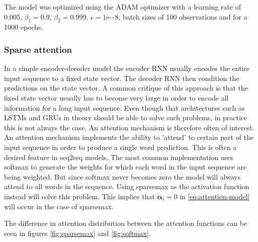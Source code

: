 The model was optimized using the ADAM optimizer with a learning rate of 0.005, $\beta_1=0.9, \, \beta_2 = 0.999, \, \epsilon = 1\mathrm{e}{-8}$, batch sizes of 100 observations and for a 1000 epochs.

\subsubsection{Sparse attention}
In a simple encoder-decoder model the encoder RNN usually encodes the entire input sequence to a fixed state vector. The decoder RNN then condition the predictions on the state vector. A common critique of this approach is that the fixed state vector usually has to become very large in order to encode all information for a long input sequence. Even though that architectures such as LSTMs and GRUs in theory should be able to solve such problems, in practice this is not always the case. An attention mechanism is therefore often of interest. An attention mechanism implements the ability to 'attend' to certain part of the input sequence in order to produce a single word prediction. This is often a desired feature in seq2seq models. The most common implementation uses softmax to generate the weights for which each word in the input sequence are being weighted. But since softmax never becomes zero the model will always attend to all words in the sequence. Using sparsemax as the activation function instead will solve this problem. This implies that $\boldsymbol\alpha_i=0$ in \eqref{eq:attention-model} will occur in the case of sparsemax.

The difference in attention distribution between the attention functions can be seen in figures \ref{fig:sparsemax} and \ref{fig:softmax}.

